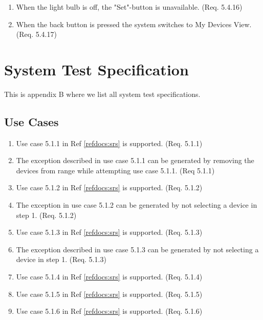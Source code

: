 \documentclass[a4paper]{article}
\newlength{\testlabellength}
\newenvironment{testlist}{\begin{enumerate}[label=\bfseries Test \thesubsection.\arabic* , labelindent=0pt, labelwidth=\testlabellength , leftmargin=2cm]}{\end{enumerate}}
\begin{document}
\begin{appendices}
\begin{testlist}
    \item When the light bulb is off, the "Set"-button is unavailable. (Req. 5.4.16)
    
    \item When the back button is pressed the system switches to My Devices View. (Req. 5.4.17)

\end{testlist}	

\newpage

\section{System Test Specification} \label{appendix:section:systemtest}
This is appendix B where we list all system test specifications.

\subsection{Use Cases}
\begin{testlist}
	\item Use case 5.1.1 in Ref \ref{refdocs:srs} is supported. (Req. 5.1.1)
	\item The exception described in use case 5.1.1 can be generated by removing the devices from range while attempting use case 5.1.1. (Req 5.1.1)
	
	\item Use case 5.1.2 in Ref \ref{refdocs:srs} is supported. (Req. 5.1.2)
	
	\item The exception in use case 5.1.2 can be generated by not selecting a device in step 1. (Req. 5.1.2)
	
	\item Use case 5.1.3 in Ref \ref{refdocs:srs} is supported. (Req. 5.1.3)
	
	\item The exception described in use case 5.1.3 can be generated by not selecting a device in step 1. (Req. 5.1.3)
	
	\item Use case 5.1.4 in Ref \ref{refdocs:srs} is supported. (Req. 5.1.4)
	
	\item Use case 5.1.5 in Ref \ref{refdocs:srs} is supported. (Req. 5.1.5)
	
	\item Use case 5.1.6 in Ref \ref{refdocs:srs} is supported. (Req. 5.1.6)
	

\end{testlist}
\end{appendices}
\end{document}
